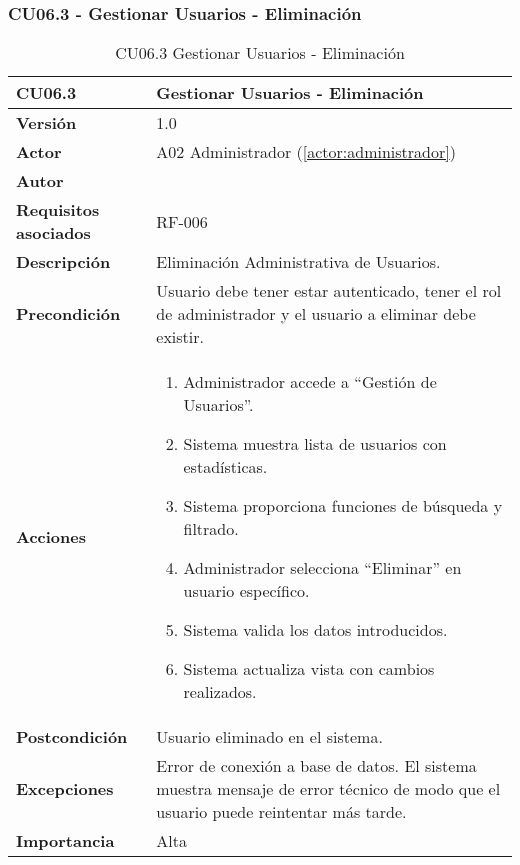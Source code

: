 \subsubsection{CU06.3 - Gestionar Usuarios - Eliminación}

\begin{table}[H]
	\centering
	\begin{tabularx}{\linewidth}{ p{} p{} }
		\toprule
		\textbf{CU06.3}    & \textbf{Gestionar Usuarios - Eliminación} \\
		\toprule
		\textbf{Versión}              & 1.0    \\
		\textbf{Actor}                & A02 Administrador (\ref{actor:administrador}) \\
		\textbf{Autor}                & \nombre \\
		\textbf{Requisitos asociados} & RF-006 \\
		\textbf{Descripción}          & Eliminación Administrativa de Usuarios. \\
		\textbf{Precondición}         & Usuario debe tener estar autenticado, tener el rol de administrador y el usuario a eliminar debe existir. \\
		\textbf{Acciones}             &
		\begin{enumerate}
			\def\labelenumi{\arabic{enumi}.}
			\tightlist
			\item Administrador accede a ``Gestión de Usuarios''.
            \item Sistema muestra lista de usuarios con estadísticas.
            \item Sistema proporciona funciones de búsqueda y filtrado.
            \item Administrador selecciona ``Eliminar'' en usuario específico.
            \item Sistema valida los datos introducidos.
            \item Sistema actualiza vista con cambios realizados.
		\end{enumerate}\\
		\textbf{Postcondición}        & Usuario eliminado en el sistema.\\
		\textbf{Excepciones}          & Error de conexión a base de datos. El sistema muestra mensaje de error técnico de modo que el usuario puede reintentar más tarde.\\
		\textbf{Importancia}          & Alta \\
		\bottomrule
	\end{tabularx}
	\caption{CU06.3 Gestionar Usuarios - Eliminación}
	\label{cu:gestionar-usuarios-eliminacion}
\end{table}





